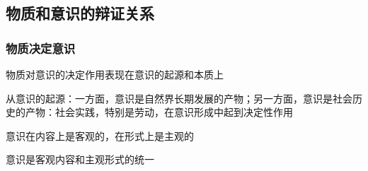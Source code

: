 \subsection{物质和意识的辩证关系}%
\label{sub:物质和意识的辩证关系}
\subsubsection{物质决定意识}%
\label{subsub:物质决定意识}
物质对意识的决定作用表现在意识的起源和本质上

从意识的起源：一方面，意识是自然界长期发展的产物；另一方面，意识是社会历史的产物：社会实践，特别是劳动，在意识形成中起到决定性作用

\begin{notation}
    意识在内容上是客观的，在形式上是主观的

    意识是客观内容和主观形式的统一
\end{notation}


